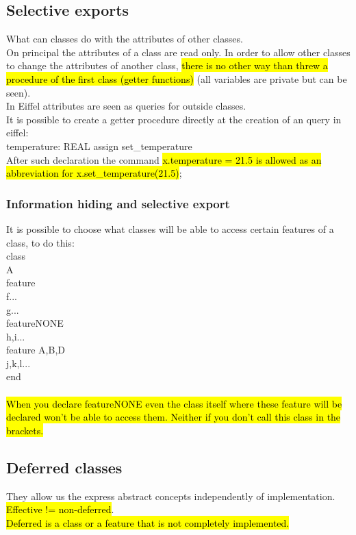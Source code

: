\documentclass[11pt]{article}
\newcommand\tab[1][1cm]{\hspace*{#1}}
\begin{document}
\subsection{Selective exports}
What can classes do with the attributes of other classes.\\On principal the attributes of a class are read only. In order to allow other classes to change the attributes of another class, \hl{there is no other way than threw a procedure of the first class (getter functions)} (all variables are private but can be seen).\\In Eiffel attributes are seen as queries for outside classes.\\ It is possible to create a getter procedure directly at the creation of an query in eiffel:\\ temperature: REAL assign set\_temperature\\After such declaration the command \hl{x.temperature = 21.5 is allowed as an abbreviation for x.set\_temperature(21.5)};
\subsubsection{Information hiding and selective export}
It is possible to choose what classes will be able to access certain features of a class, to do this:\\class\\\tab A\\feature\\\tab f...\\\tab g...\\feature{NONE}\\\tab h,i...\\feature {A,B,D}\\\tab j,k,l...\\end\\\\ \hl{When you declare feature{NONE} even the class itself where these feature will be declared won't be able to access them. Neither if you don't call this class in the brackets.}
\subsection{Deferred classes}
They allow us the express abstract concepts independently of implementation. \hl{Effective != non-deferred}. \\\hl{Deferred is a class or a feature that is not completely implemented.} 
\end{document}

